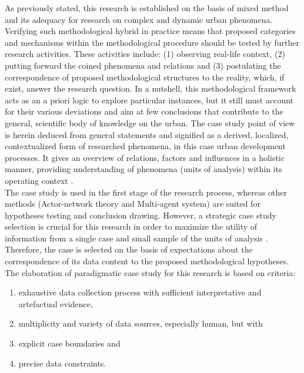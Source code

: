 \documentclass[11pt]{report}
\begin{document}
As previously stated, this research is established on the basis of mixed method and its adequacy for research on complex and dynamic urban phenomena. Verifying such methodological hybrid in practice means that proposed categories and mechanisms within the methodological procedure should be tested by further research activities.
These activities include: (1) observing real-life context, (2) putting forward the coined phenomena and relations and (3) postulating the correspondence of proposed methodological structures to the reality, which, if exist, answer the research question.
In a nutshell, this methodological framework acts as an a priori logic to explore particular instances, but it still must account for their various deviations and aim at few conclusions that contribute to the general, scientific body of knowledge on the urban. The case study point of view is herein deduced from general statements and signified as a derived, localized, contextualized form of researched phenomena, in this case urban development processes. It gives an overview of relations, factors and influences in a holistic manner, providing understanding of phenomena (units of analysis) within its operating context \cite{(Harrison 2002)}.
\\
The case study is used in the first stage of the research process, whereas other methods (Actor-network theory and Multi-agent system) are suited for hypotheses testing and conclusion drawing. However, a strategic case study selection is crucial for this research in order to maximize the utility of information from a single case and small sample of the units of analysis \cite{(Flyvbjerg 2006)}.
Therefore, the case is selected on the basis of expectations about the correspondence of its data content to the proposed methodological hypotheses. The elaboration of paradigmatic case study for this research is based on \cite{Yin's (XXXX)} criteria:
\begin{enumerate}
\item exhaustive data collection process with sufficient interpretative and artefactual evidence,
\item multiplicity and variety of data sources, especially human, but with
\item explicit case boundaries and
\item precise data constraints.
\end{enumerate}
\end{document}
